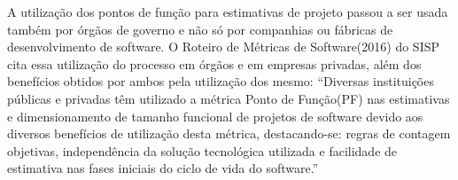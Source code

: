 A utilização dos pontos de função para estimativas de projeto passou a ser usada também por órgãos de governo e não só por companhias ou fábricas de desenvolvimento de software. O Roteiro de Métricas de Software(2016) do SISP cita essa utilização do processo em órgãos e em empresas privadas, além dos benefícios obtidos por ambos pela utilização dos mesmo:  “Diversas instituições públicas e privadas têm utilizado a métrica Ponto de Função(PF) nas estimativas e dimensionamento de tamanho funcional de projetos de software devido aos diversos benefícios de utilização desta métrica, destacando-se: regras de contagem objetivas, independência da solução tecnológica utilizada e facilidade de estimativa nas fases iniciais do ciclo de vida do software.”
